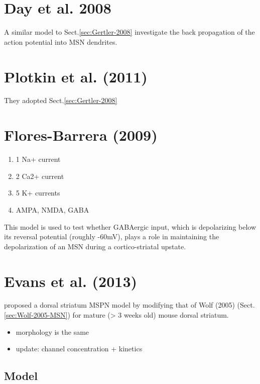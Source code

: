 \section{Day et al. 2008}

A similar model to Sect.\ref{sec:Gertler-2008} investigate the back propagation
of the action potential into MSN dendrites.

\section{Plotkin et al. (2011)}

They adopted Sect.\ref{sec:Gertler-2008}	

\section{Flores-Barrera (2009)}

\begin{enumerate}
  \item 1 Na+ current
  
  \item 2 Ca2+ current
  
  \item 5 K+ currents
  
  \item AMPA, NMDA, GABA
\end{enumerate}

This model is used to test whether GABAergic input, which is depolarizing below
its reversal potential (roughly -60mV), plays a role in maintaining the
depolarization of an MSN during a cortico-striatal upstate.

\section{Evans et al. (2013)}
\label{sec:Evans-2012}

\citep{evans2012} proposed a dorsal striatum MSPN model by modifying that of
Wolf (2005) (Sect.\ref{sec:Wolf-2005-MSN}) for mature (> 3 weeks old) mouse dorsal
striatum.
\begin{itemize}
  \item morphology is the same
  
  \item update: channel concentration + kinetics
\end{itemize}

\subsection{Model}

